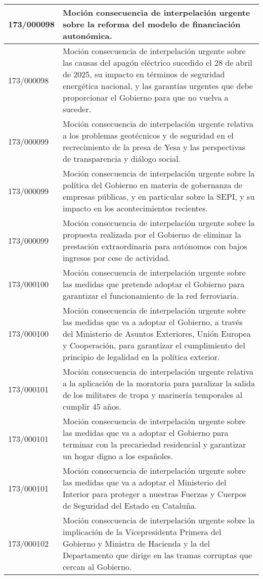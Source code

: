 {\begin{table}[H]
\begin{center}
\begin{tabularx}{\linewidth}{| l | X |}
\hline
173/000098 & Moción consecuencia de interpelación urgente sobre la reforma del modelo de financiación autonómica. \\
\hline
173/000098 & Moción consecuencia de interpelación urgente sobre las causas del apagón eléctrico sucedido el 28 de abril de 2025, su impacto en términos de seguridad energética nacional, y las garantías urgentes que debe proporcionar el Gobierno para que no vuelva a suceder. \\
\hline
173/000099 & Moción consecuencia de interpelación urgente relativa a los problemas geotécnicos y de seguridad en el recrecimiento de la presa de Yesa y las perspectivas de transparencia y diálogo social. \\
\hline
173/000099 & Moción consecuencia de interpelación urgente sobre la política del Gobierno en materia de gobernanza de empresas públicas, y en particular sobre la SEPI, y su impacto en los acontecimientos recientes. \\
\hline
173/000099 & Moción consecuencia de interpelación urgente sobre la propuesta realizada por el Gobierno de eliminar la prestación extraordinaria para autónomos con bajos ingresos por cese de actividad. \\
\hline
173/000100 & Moción consecuencia de interpelación urgente sobre las medidas que pretende adoptar el Gobierno para garantizar el funcionamiento de la red ferroviaria. \\
\hline
173/000100 & Moción consecuencia de interpelación urgente sobre las medidas que va a adoptar el Gobierno, a través del Ministerio de Asuntos Exteriores, Unión Europea y Cooperación, para garantizar el cumplimiento del principio de legalidad en la política exterior. \\
\hline
173/000101 & Moción consecuencia de interpelación urgente relativa a la aplicación de la moratoria para paralizar la salida de los militares de tropa y marinería temporales al cumplir 45 años. \\
\hline
173/000101 & Moción consecuencia de interpelación urgente sobre las medidas que va a adoptar el Gobierno para terminar con la precariedad residencial y garantizar un hogar digno a los españoles. \\
\hline
173/000101 & Moción consecuencia de interpelación urgente sobre las medidas que va a adoptar el Ministerio del Interior para proteger a nuestras Fuerzas y Cuerpos de Seguridad del Estado en Cataluña. \\
\hline
173/000102 & Moción consecuencia de interpelación urgente sobre la implicación de la Vicepresidenta Primera del Gobierno y Ministra de Hacienda y la del Departamento que dirige en las tramas corruptas que cercan al Gobierno. \\

\end{tabularx}
\end{center}
\end{table}}
